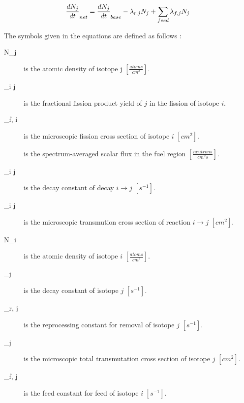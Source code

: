 \begin{equation} \hfill
\frac{dN_j}{dt}_{net} = \frac{dN_j}{dt}_{base} -  \lambda_{r, j} N_j + \sum_{feed} \lambda _{f, j} N_j
\hfill\label{eq:Bateman_type_one_decay} \end{equation}

The symbols given in the equations are defined as follows \cite{leppanen_development_2007}:
\begin{description}
\item[N_j] is the atomic density of isotope j $\left[\frac{atoms}{cm^3}\right]$.
\item[\gamma_{i \rightarrow j}] is the fractional fission product yield of $j$ in the fission of isotope $i$.
\item[\sigma_{f, i}] is the microscopic fission cross section of isotope $i$ $\left[cm^2\right]$.
\item[\Phi] is the spectrum-averaged scalar flux in the fuel region $\left[\frac{neutrons}{cm^2 s}\right]$.
\item[\lambda _{i \rightarrow j}] is the decay constant of decay $i \rightarrow j$ $\left[s^{-1}\right]$.
\item[\sigma_{i \rightarrow j}] is the microscopic transmution cross section of reaction $i \rightarrow j$ $\left[cm^2\right]$.
\item[N_i] is the atomic density of isotope $i$ $\left[\frac{atoms}{cm^3}\right]$.
\item[\lambda_j] is the decay constant of isotope $j$ $\left[s^{-1}\right]$.
\item[\lambda_{r, j}] is the reprocessing constant for removal of isotope $j$ $\left[s^{-1}\right]$.
\item[\sigma_j] is the microscopic total transmutation cross section of isotope $j$ $\left[cm^2\right]$.
\item[\lambda _{f, j}] is the feed constant for feed of isotope $i$ $\left[s^{-1}\right]$.
\end{description}

